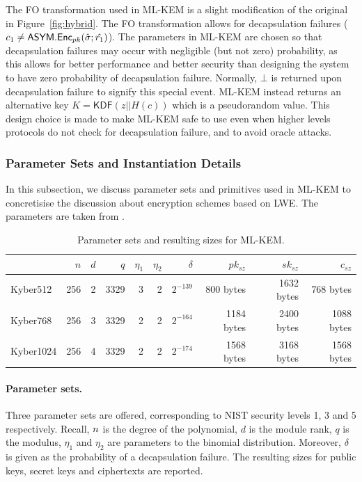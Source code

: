 The FO transformation used in ML-KEM is a slight modification of the original in Figure~\ref{fig:hybrid}. The FO transformation allows for decapsulation failures ($c_1 \neq \mathsf{ASYM}.\mathsf{Enc}_{pk}(\hat\sigma; \hat{r_1})$). The parameters in ML-KEM are chosen so that decapsulation failures may occur with negligible (but not zero) probability, as this allows for better performance and better security than designing the system to have zero probability of decapsulation failure. Normally, $\bot$ is returned upon decapsulation failure to signify this special event. ML-KEM instead returns an alternative key $K = \mathsf{KDF}(z || H(c))$ which is a pseudorandom value. This design choice is made to make ML-KEM safe to use even when higher levels protocols do not check for decapsulation failure, and to avoid oracle attacks.

\subsubsection{Parameter Sets and Instantiation Details}
In this subsection, we discuss parameter sets and primitives used in ML-KEM to concretisise the discussion about encryption schemes based on LWE. The parameters are taken from \cite{kyberspec}.

\begin{table}[h!]
\centering
\caption{Parameter sets and resulting sizes for ML-KEM.}
\label{tab:kyber-params}
\begin{tabular}{l | r r r r r r | r r r }
\toprule
 & $n$ & $d$ & $q$ & $\eta_1$ & $\eta_2$ & $\delta$ & $pk_{sz}$ & $sk_{sz}$ & $c_{sz}$ \\
\midrule
Kyber512  & 256 & 2 & 3329 & 3 & 2 & $2^{-139}$ & 800 bytes & 1632 bytes & 768 bytes \\
Kyber768  & 256 & 3 & 3329 & 2 & 2 & $2^{-164}$ & 1184 bytes & 2400 bytes & 1088 bytes \\
Kyber1024 & 256 & 4 & 3329 & 2 & 2 & $2^{-174}$ & 1568 bytes & 3168 bytes & 1568 bytes \\
\bottomrule
\end{tabular}
\end{table}

\paragraph{Parameter sets.} Three parameter sets are offered, corresponding to NIST security levels 1, 3 and 5 respectively. Recall, $n$ is the degree of the polynomial, $d$ is the module rank, $q$ is the modulus, $\eta_1$ and $\eta_2$ are parameters to the binomial distribution. Moreover, $\delta$ is given as the probability of a decapsulation failure. The resulting sizes for public keys, secret keys and ciphertexts are reported.


